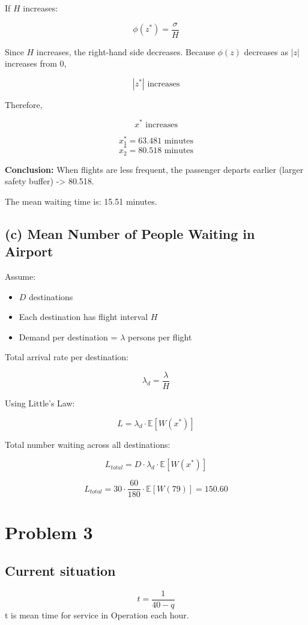 \documentclass{KPS_assignment}
\begin{document}
If $H$ increases:

\[
\phi(z^*) = \frac{\sigma}{H}
\]

Since $H$ increases, the right-hand side decreases.
Because $\phi(z)$ decreases as $|z|$ increases from $0$,

\[
|z^*| \text{ increases}
\]

Therefore,

\[
x^* \text{ increases}
\]

\[
x_1^* = 63.481 \text{ minutes}
\]
\[
x_2^* = 80.518 \text{ minutes}
\]

\textbf{Conclusion:}  
When flights are less frequent, the passenger departs earlier (larger safety buffer) -> 80.518.

The mean waiting time is: 15.51 minutes.

\subsection*{(c) Mean Number of People Waiting in Airport}

Assume:

\begin{itemize}
    \item $D$ destinations
    \item Each destination has flight interval $H$
    \item Demand per destination = $\lambda$ persons per flight
\end{itemize}

Total arrival rate per destination:

\[
\lambda_d = \frac{\lambda}{H}
\]

Using Little's Law:

\[
L = \lambda_d \cdot \mathbb{E}[W(x^*)]
\]

Total number waiting across all destinations:

\[
L_{total} = D \cdot \lambda_d \cdot \mathbb{E}[W(x^*)]
\]

\[
L_{total} = 30 \cdot \frac{60}{180} \cdot \mathbb{E}[W(79)] = 150.60
\]


\section*{Problem 3}

\subsection*{Current situation}
\[
t = \frac{1}{40-q}
\]
t is mean time for service in Operation each hour.
\end{document}
